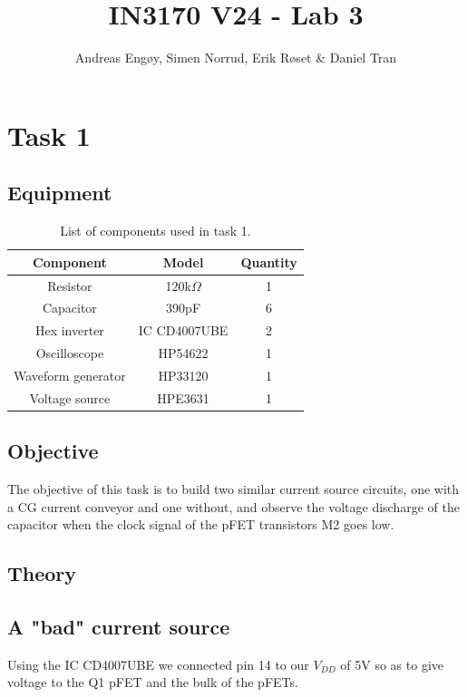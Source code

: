 \documentclass[onecolumn]{article}
\title{IN3170 V24 - Lab 3}
\author{Andreas Engøy, Simen Norrud, Erik Røset \& Daniel Tran}
\date{\monthname[\the\month] \the\year}
\begin{document}
\maketitle


\section{Task 1}
\subsection{Equipment}
\begin{table}[h]
    \centering
    \begin{tabular}{|c|c|c|}
        \hline
        \textbf{Component} & \textbf{Model} & \textbf{Quantity} \\
        \hline
        Resistor & 120k$\Omega$ & 1 \\
        Capacitor & 390pF & 6 \\
        Hex inverter & IC CD4007UBE & 2 \\
        Oscilloscope & HP54622 & 1 \\
        Waveform generator  & HP33120 & 1\\
        Voltage source & HPE3631 & 1 \\
        \hline
    \end{tabular}
    \caption{List of components used in task 1.}
    \label{tab:bom}
\end{table}

\subsection{Objective}
The objective of this task is to build two similar current source circuits, one with a CG current conveyor and one without, and observe the voltage discharge of the capacitor when the clock signal of the pFET transistors M2 goes low.  

\subsection{Theory}

\subsection{A "bad" current source}

Using the IC CD4007UBE we connected pin 14 to our $V_{DD}$ of 5V so as to give voltage to the Q1 pFET and the bulk of the pFETs.
\end{document}
